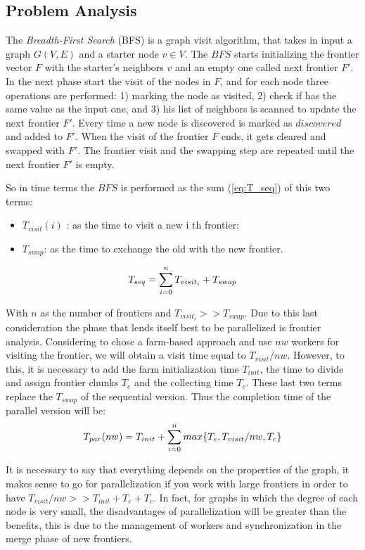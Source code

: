 \subsection{Problem Analysis}
\label{sec:Problem_Analysis}
The \textit{Breadth-First Search} (BFS) is a graph visit algorithm, that takes in input a graph $G(V, E)$ and a starter node $v\in V$. The $BFS$ starts initializing the frontier vector $F$ with the starter's neighbors $v$ and an empty one called next frontier $F'$. In the next phase start the visit of the nodes in $F$, and for each node three operations are performed: 1) marking the node as visited, 2) check if has the same value as the input one, and 3) his list of neighbors is scanned to update the next frontier $F'$. Every time a new node is discovered is marked as $discovered$ and added to $F'$. When the visit of the frontier $F$ ends, it gets cleared and swapped with $F'$. The frontier visit and the swapping step are repeated until the next frontier $F'$ is empty. 

So in time terms the $BFS$ is performed as the sum (\ref{eq:T_seq}) of this two terms:

\begin{itemize}
    \item $T_{visit} (i)$ : as the time to visit a new i th frontier;
    \item $T_{swap}$: as the time to exchange the old with the new frontier.
\end{itemize}

\begin{equation}
\centering
T_{seq} = \displaystyle \sum_{i=0}^n T_{visit_i} + T_{swap}
\label{eq:T_seq}
\end{equation}

With $n$ as the number of frontiers and  $T_{visit_i} >>  T_{swap}$. Due to this last consideration the phase that lends itself best to be parallelized is frontier analysis. 
Considering to chose a farm-based approach and use $nw$ workers for visiting the frontier, we will obtain a visit time equal to $T_{visit}/nw$. However, to this, it is necessary to add the farm initialization time $T_{init}$, the time to divide and assign frontier chunks $T_e$ and the collecting time $T_c$. These last two terms replace the $T_{swap}$ of the sequential version.   
Thus the completion time of the parallel version will be:
\begin{equation}
\centering
T_{par}(nw) = T_{init} + \displaystyle \sum_{i=0}^n max\{T_e, T_{visit}/nw, T_c\}
\label{eq:T_par}
\end{equation}

It is necessary to say that everything depends on the properties of the graph, it makes sense to go for parallelization if you work with large frontiers in order to have $T_{visit}/nw >> T_{init} + T_e + T_c$. In fact, for graphs in which the degree of each node is very small, the disadvantages of parallelization will be greater than the benefits, this is due to the management of workers and synchronization in the merge phase of new frontiers. 
